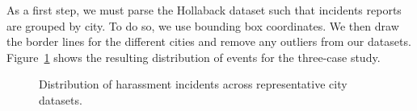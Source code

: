 \documentclass{acm_proc_article-sp}
\begin{document}
As a first step, we must parse the Hollaback dataset such that incidents reports are grouped by city. To do so, we use bounding box coordinates. We then draw the border lines for the different cities and remove any outliers from our datasets. Figure~\ref{fig:citiesDistribution} shows the resulting distribution of events for the three-case study. \par
\begin{figure}[!h]
\centering
{}\par\medskip
{}\par\medskip    
{}
\caption{Distribution of harassment incidents across representative city datasets.}
\label{fig:citiesDistribution}
\end{figure}
\end{document}
